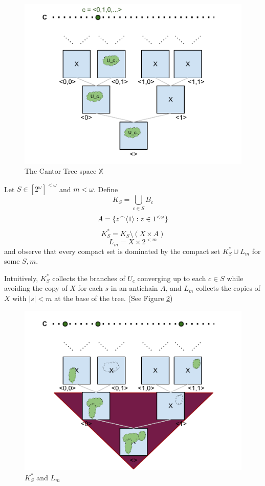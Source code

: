 \begin{figure}[p]
  \centering
  \includegraphics[width=6in]{cantor_tree_open.pdf}
  \caption{The Cantor Tree space $\mathbb{X}$}
  \label{fig:cantor_tree}
\end{figure}

\begin{definition}
Let $S\in[2^\omega]^{<\omega}$ and $m<\omega$. Define 
  \[
    K_S = \bigcup_{c \in S} B_c
  \] 
  \[ 
    A = \{z^\frown \langle1\rangle : z \in 1^{<\omega}\}
  \] 
  \[ 
    K^*_S = K_S \setminus (X \times A)
  \] 
  \[
    L_m = X \times 2^{<m}
  \] 
and observe that every compact set is dominated by the compact set $K^*_S \cup L_m$ for some $S,m$.

Intuitively, $K^*_S$ collects the branches of $U_c$ converging up to each $c \in S$ while avoiding the copy of $X$ for each $s$ in an antichain $A$, and $L_m$ collects the copies of $X$ with $|s| < m$ at the base of the tree. (See Figure \ref{fig:cantor_tree_compact})
\end{definition}

\begin{figure}[p]
  \centering
  \includegraphics[width=6in]{cantor_tree_compact.pdf}
  \caption{$K^*_S$ and $L_m$}
  \label{fig:cantor_tree_compact}
\end{figure}

